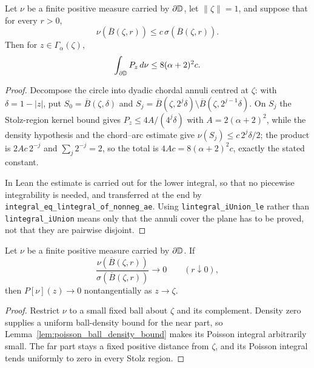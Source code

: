 \begin{lemma}
  \label{lem:poisson_ball_density_bound}
  \leanok
  Let $\nu$ be a finite positive measure carried by $\partial\mathbb{D}$, let
  $\|\zeta\|=1$, and suppose that for every $r>0$,
  \[
    \nu(\overline B(\zeta,r))
      \le c\,\sigma(\overline B(\zeta,r)).
  \]
  Then for $z\in\Gamma_\alpha(\zeta)$,
  \[
    \int_{\partial\mathbb{D}}P_z\,d\nu\le 8(\alpha+2)^2c.
  \]
  \begin{proof}
    \leanok
    Decompose the circle into dyadic chordal annuli centred at $\zeta$: with
    $\delta=1-|z|$, put $S_0=\overline B(\zeta,\delta)$ and
    $S_j=\overline B(\zeta,2^j\delta)\setminus\overline B(\zeta,2^{j-1}\delta)$.
    On $S_j$ the Stolz-region kernel bound gives
    $P_z\le 4A/(4^j\delta)$ with $A=2(\alpha+2)^2$, while the density
    hypothesis and the chord--arc estimate give
    $\nu(S_j)\le c\,2^j\delta/2$; the product is $2Ac\,2^{-j}$ and
    $\sum_j 2^{-j}=2$, so the total is $4Ac=8(\alpha+2)^2c$, exactly the
    stated constant.

    In Lean the estimate is carried out for the lower integral, so that no
    piecewise integrability is needed, and transferred at the end by
    \texttt{integral\_eq\_lintegral\_of\_nonneg\_ae}. Using
    \texttt{lintegral\_iUnion\_le} rather than \texttt{lintegral\_iUnion}
    means only that the annuli cover the plane has to be proved, not that they
    are pairwise disjoint.
  \end{proof}
\end{lemma}

\begin{lemma}
  \label{lem:poisson_density_zero}
  \leanok
  Let $\nu$ be a finite positive measure carried by $\partial\mathbb{D}$. If
  \[
    \frac{\nu(\overline B(\zeta,r))}
         {\sigma(\overline B(\zeta,r))}\longrightarrow0
    \qquad(r\downarrow0),
  \]
  then $P[\nu](z)\to0$ nontangentially as $z\to\zeta$.
  \begin{proof}
    \leanok
    Restrict $\nu$ to a small fixed ball about $\zeta$ and its complement.
    Density zero supplies a uniform ball-density bound for the near part, so
    Lemma~\ref{lem:poisson_ball_density_bound} makes its Poisson integral
    arbitrarily small. The far part stays a fixed positive distance from
    $\zeta$, and its Poisson integral tends uniformly to zero in every Stolz
    region.
  \end{proof}
\end{lemma}

